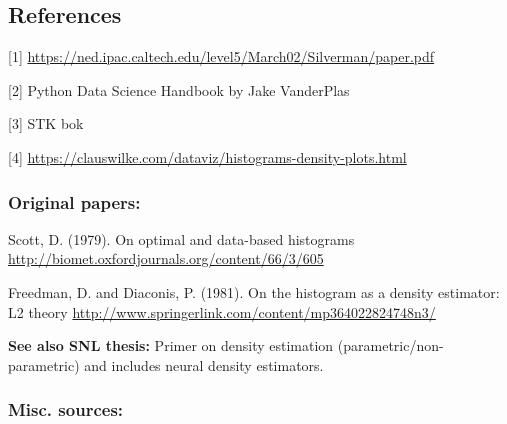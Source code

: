 \subsection{References}

[1] \url{https://ned.ipac.caltech.edu/level5/March02/Silverman/paper.pdf}

[2] Python Data Science Handbook by Jake VanderPlas

[3] STK bok

[4] \url{https://clauswilke.com/dataviz/histograms-density-plots.html}

\subsubsection{Original papers:} 

Scott, D. (1979). On optimal and data-based histograms \url{http://biomet.oxfordjournals.org/content/66/3/605}

Freedman, D. and Diaconis, P. (1981). On the histogram as a density estimator: L2 theory \url{http://www.springerlink.com/content/mp364022824748n3/}

\textbf{See also SNL thesis:} Primer on density estimation (parametric/non-parametric) and includes neural density estimators. 

\subsubsection{Misc. sources:}

